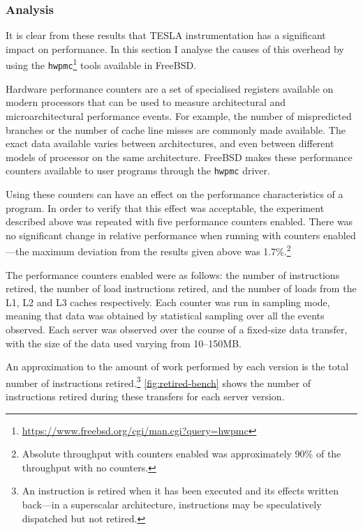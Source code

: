 \subsubsection{Analysis}

It is clear from these results that TESLA instrumentation has a
significant impact on performance. In this section I analyse the causes
of this overhead by using the
\texttt{hwpmc}\footnote{\url{https://www.freebsd.org/cgi/man.cgi?query=hwpmc}}
tools available in FreeBSD.

Hardware performance counters are a set of specialised registers
available on modern processors that can be used to measure architectural
and microarchitectural performance events. For example, the number of
mispredicted branches or the number of cache line misses are commonly
made available. The exact data available varies between architectures,
and even between different models of processor on the same architecture.
FreeBSD makes these performance counters available to user programs
through the \texttt{hwpmc} driver.

Using these counters can have an effect on the performance
characteristics of a program. In order to verify that this effect was
acceptable, the experiment described above was repeated with five
performance counters enabled. There was no significant change in
relative performance when running with counters enabled---the maximum
deviation from the results given above was 1.7\%.\footnote{Absolute
throughput with counters enabled was approximately 90\% of the
throughput with no counters.}

The performance counters enabled were as follows: the number of
instructions retired, the number of load instructions retired, and the
number of loads from the L1, L2 and L3 caches respectively. Each counter
was run in sampling mode, meaning that data was obtained by statistical
sampling over all the events observed. Each server was observed over the
course of a fixed-size data transfer, with the size of the data used
varying from 10--150MB.

An approximation to the amount of work performed by each version is the
total number of instructions retired.\footnote{An instruction is retired
when it has been executed and its effects written back---in a
superscalar architecture, instructions may be speculatively dispatched
but not retired.} \autoref{fig:retired-bench} shows the number of
instructions retired during these transfers for each server version.

